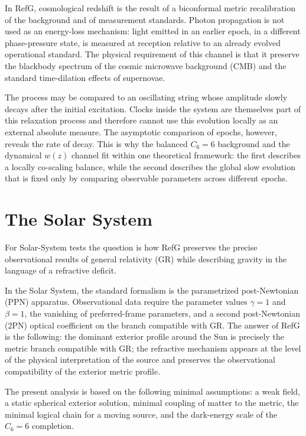 \documentclass[12pt]{article}
\begin{document}
In RefG, cosmological redshift is the result of a biconformal metric recalibration of the background and of measurement standards. Photon propagation is not used as an energy-loss mechanism: light emitted in an earlier epoch, in a different phase-pressure state, is measured at reception relative to an already evolved operational standard. The physical requirement of this channel is that it preserve the blackbody spectrum of the cosmic microwave background (CMB) and the standard time-dilation effects of supernovae.

The process may be compared to an oscillating string whose amplitude slowly decays after the initial excitation. Clocks inside the system are themselves part of this relaxation process and therefore cannot use this evolution locally as an external absolute measure. The asymptotic comparison of epochs, however, reveals the rate of decay. This is why the balanced $C_6=6$ background and the dynamical $w(z)$ channel fit within one theoretical framework: the first describes a locally co-scaling balance, while the second describes the global slow evolution that is fixed only by comparing observable parameters across different epochs.

\section{The Solar System}

For Solar-System tests the question is how RefG preserves the precise observational results of general relativity (GR) while describing gravity in the language of a refractive deficit.

In the Solar System, the standard formalism is the parametrized post-Newtonian (PPN) apparatus. Observational data require the parameter values $\gamma=1$ and $\beta=1$, the vanishing of preferred-frame parameters, and a second post-Newtonian (2PN) optical coefficient on the branch compatible with GR. The answer of RefG is the following: the dominant exterior profile around the Sun is precisely the metric branch compatible with GR; the refractive mechanism appears at the level of the physical interpretation of the source and preserves the observational compatibility of the exterior metric profile.

The present analysis is based on the following minimal assumptions: a weak field, a static spherical exterior solution, minimal coupling of matter to the metric, the minimal logical chain for a moving source, and the dark-energy scale of the $C_6=6$ completion.
\end{document}
